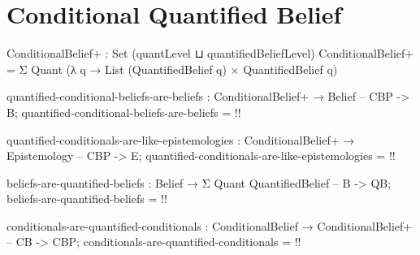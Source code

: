 \documentclass{article}
\begin{document}
\section{Conditional Quantified Belief}

\begin{code}
ConditionalBelief+ : Set (quantLevel ⊔ quantifiedBeliefLevel)
ConditionalBelief+ = Σ Quant (λ q → List (QuantifiedBelief q)
                                  × QuantifiedBelief q)
\end{code}

\begin{code}
quantified-conditional-beliefs-are-beliefs :
  ConditionalBelief+ → Belief -- CBP -> B;
quantified-conditional-beliefs-are-beliefs = {!!}
\end{code}

\begin{code}
quantified-conditionals-are-like-epistemologies :
  ConditionalBelief+ → Epistemology -- CBP -> E;
quantified-conditionals-are-like-epistemologies = {!!}
\end{code}

\begin{code}
beliefs-are-quantified-beliefs :
  Belief → Σ Quant QuantifiedBelief -- B -> QB;
beliefs-are-quantified-beliefs = {!!}
\end{code}

\begin{code}
conditionals-are-quantified-conditionals :
  ConditionalBelief → ConditionalBelief+ -- CB -> CBP;
conditionals-are-quantified-conditionals = {!!}
\end{code}
\end{document}

